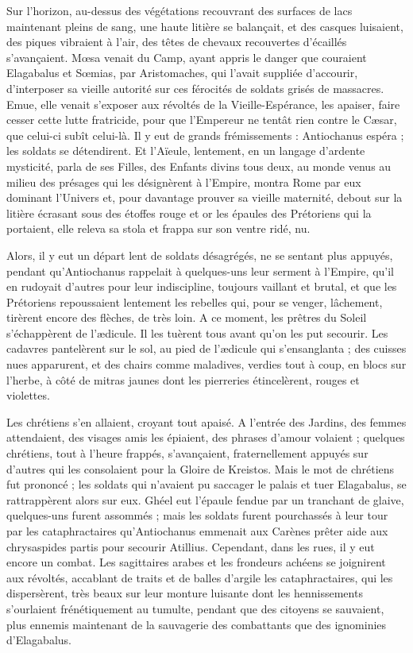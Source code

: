 \documentclass[a4paper, 11pt, oneside, polutonikogreek, french]{article}
\begin{document}
Sur l'horizon, au-dessus des végétations recouvrant des surfaces de lacs maintenant pleins de sang, une haute litière se balançait, et des casques luisaient, des piques vibraient à l'air, des têtes de chevaux recouvertes d'écaillés s'avançaient. Mœsa venait du Camp, ayant appris le danger que couraient Elagabalus et Sœmias, par Aristomaches, qui l'avait suppliée d'accourir, d'interposer sa vieille autorité sur ces férocités de soldats grisés de massacres. Emue, elle venait s'exposer aux révoltés de la Vieille-Espérance, les apaiser, faire cesser cette lutte fratricide, pour que l'Empereur ne tentât rien contre le Cæsar, que celui-ci subît celui-là. Il y eut de grands frémissements : Antiochanus espéra ; les soldats se détendirent. Et l'Aïeule, lentement, en un langage d'ardente mysticité, parla de ses Filles, des Enfants divins tous deux, au monde venus au milieu des présages qui les désignèrent à l'Empire, montra Rome par eux dominant l'Univers et, pour davantage prouver sa vieille maternité, debout sur la litière écrasant sous des étoffes rouge et or les épaules des Prétoriens qui la portaient, elle releva sa stola et frappa sur son ventre ridé, nu.

Alors, il y eut un départ lent de soldats désagrégés, ne se sentant plus appuyés, pendant qu'Antiochanus rappelait à quelques-uns leur serment à l'Empire, qu'il en rudoyait d'autres pour leur indiscipline, toujours vaillant et brutal, et que les Prétoriens repoussaient lentement les rebelles qui, pour se venger, lâchement, tirèrent encore des flèches, de très loin. A ce moment, les prêtres du Soleil s'échappèrent de l'ædicule. Il les tuèrent tous avant qu'on les put secourir. Les cadavres pantelèrent sur le sol, au pied de l'ædicule qui s'ensanglanta ; des cuisses nues apparurent, et des chairs comme maladives, verdies tout à coup, en blocs sur l'herbe, à côté de mitras jaunes dont les pierreries étincelèrent, rouges et violettes.

Les chrétiens s'en allaient, croyant tout apaisé. A l'entrée des Jardins, des femmes attendaient, des visages amis les épiaient, des phrases d'amour volaient ; quelques chrétiens, tout à l'heure frappés, s'avançaient, fraternellement appuyés sur d'autres qui les consolaient pour la Gloire de Kreistos. Mais le mot de chrétiens fut prononcé ; les soldats qui n'avaient pu saccager le palais et tuer Elagabalus, se rattrappèrent alors sur eux. Ghéel eut l'épaule fendue par un tranchant de glaive, quelques-uns furent assommés ; mais les soldats furent pourchassés à leur tour par les cataphractaires qu'Antiochanus emmenait aux Carènes prêter aide aux chrysaspides partis pour secourir Atillius. Cependant, dans les rues, il y eut encore un combat. Les sagittaires arabes et les frondeurs achéens se joignirent aux révoltés, accablant de traits et de balles d'argile les cataphractaires, qui les dispersèrent, très beaux sur leur monture luisante dont les hennissements s'ourlaient frénétiquement au tumulte, pendant que des citoyens se sauvaient, plus ennemis maintenant de la sauvagerie des combattants que des ignominies d'Elagabalus.
\end{document}
